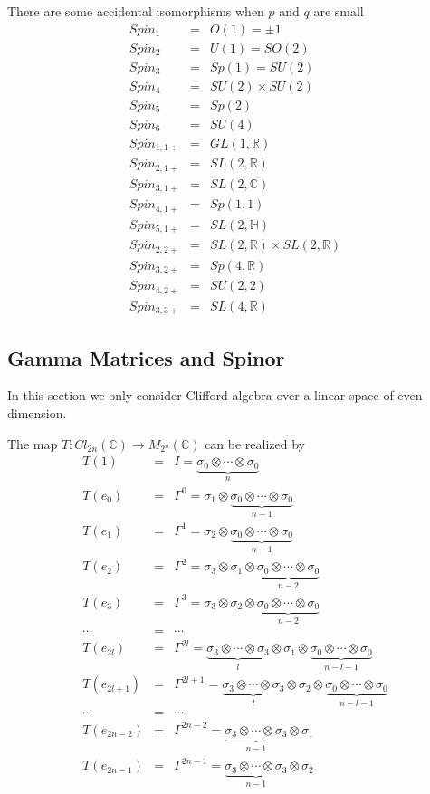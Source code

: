 \documentclass[12pt]{book}
\begin{document}
	There are some accidental isomorphisms when $p$ and $q$ are small
	\begin{eqnarray}
		Spin_1&=&O(1)=\pm 1\\
		Spin_2&=&U(1)=SO(2)\\
		Spin_3&=&Sp(1)=SU(2)\\
		Spin_4&=&SU(2)\times SU(2)\\
		Spin_5&=&Sp(2)\\
		Spin_6&=&SU(4)\\
		Spin_{1,1+}&=&GL(1,\mathbb R)\\
		Spin_{2,1+}&=&SL(2,\mathbb R)\\
		Spin_{3,1+}&=&SL(2,\mathbb C)\\
		Spin_{4,1+}&=&Sp(1,1)\\
		Spin_{5,1+}&=&SL(2,\mathbb H)\\
		Spin_{2,2+}&=&SL(2,\mathbb R)\times SL(2,\mathbb R)\\
		Spin_{3,2+}&=&Sp(4,\mathbb R)\\
		Spin_{4,2+}&=&SU(2,2)\\
		Spin_{3,3+}&=&SL(4,\mathbb R)
	\end{eqnarray}
	
	\subsection{Gamma Matrices and Spinor}
	In this section we only consider Clifford algebra over a linear space of even dimension.
	
	The map $T:Cl_{2n}(\mathbb C)\rightarrow M_{2^n}(\mathbb C)$ can be realized by
	\begin{eqnarray}
		T(1)&=&I=\underbrace{\sigma_0\otimes\cdots\otimes\sigma_0}_n\\
		T(e_0)&=&\Gamma^0=\sigma_1\otimes\underbrace{\sigma_0\otimes\cdots\otimes\sigma_0}_{n-1}\\
		T(e_1)&=&\Gamma^1=\sigma_2\otimes\underbrace{\sigma_0\otimes\cdots\otimes\sigma_0}_{n-1}\\
		T(e_2)&=&\Gamma^2=\sigma_3\otimes\sigma_1\otimes\underbrace{\sigma_0\otimes\cdots\otimes\sigma_0}_{n-2}\\
		T(e_3)&=&\Gamma^3=\sigma_3\otimes\sigma_2\otimes\underbrace{\sigma_0\otimes\cdots\otimes\sigma_0}_{n-2}\\
		\cdots&=&\cdots\\
		T(e_{2l})&=&\Gamma^{2l}=\underbrace{\sigma_3\otimes\cdots\otimes\sigma_3}_l\otimes\sigma_1\otimes\underbrace{\sigma_0\otimes\cdots\otimes\sigma_0}_{n-l-1}\\
		T(e_{2l+1})&=&\Gamma^{2l+1}=\underbrace{\sigma_3\otimes\cdots\otimes\sigma_3}_l\otimes\sigma_2\otimes\underbrace{\sigma_0\otimes\cdots\otimes\sigma_0}_{n-l-1}\\
		\cdots&=&\cdots\\
		T(e_{2n-2})&=&\Gamma^{2n-2}=\underbrace{\sigma_3\otimes\cdots\otimes\sigma_3}_{n-1}\otimes\sigma_1\\
		T(e_{2n-1})&=&\Gamma^{2n-1}=\underbrace{\sigma_3\otimes\cdots\otimes\sigma_3}_{n-1}\otimes\sigma_2\\
	\end{eqnarray}
	
\end{document}
